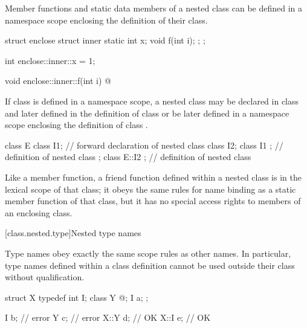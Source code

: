 \pnum
Member functions and static data members of a nested class can be
defined in a namespace scope enclosing the definition of their class.
\begin{example}
\begin{codeblock}
struct enclose {
  struct inner {
    static int x;
    void f(int i);
  };
};

int enclose::inner::x = 1;

void enclose::inner::f(int i) { @\commentellip@ }
\end{codeblock}
\end{example}

\pnum
If class  is defined in a namespace scope, a nested class
 may be declared in class  and later defined in the
definition of class  or be later defined in a namespace scope
enclosing the definition of class .
\begin{example}
\begin{codeblock}
class E {
  class I1;                     // forward declaration of nested class
  class I2;
  class I1 { };                 // definition of nested class
};
class E::I2 { };                // definition of nested class
\end{codeblock}
\end{example}

\pnum
{}%
Like a member function, a friend function defined
within a nested class is in the lexical scope of that class; it obeys
the same rules for name binding as a static member function of that
class, but it has no special access rights to
members of an enclosing class.

[class.nested.type]{Nested type names}
%
%

\pnum
Type names obey exactly the same scope rules as other names. In
particular, type names defined within a class definition cannot be used
outside their class without qualification.
\begin{example}
\begin{codeblock}
struct X {
  typedef int I;
  class Y { @\commentellip@ };
  I a;
};

I b;                            // error
Y c;                            // error
X::Y d;                         // OK
X::I e;                         // OK
\end{codeblock}
\end{example}

